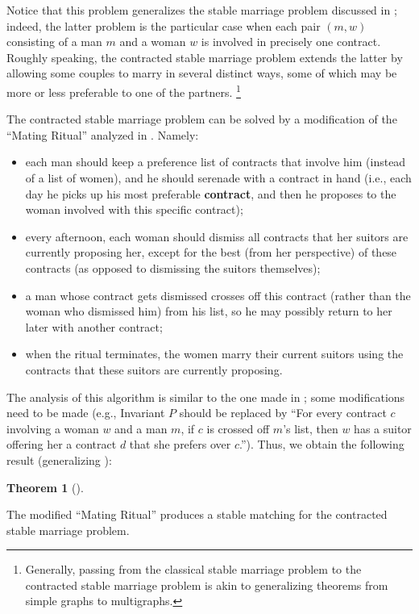 \documentclass[numbers=enddot,12pt,final,onecolumn,notitlepage]{scrartcl}%
\theoremstyle{definition}
\newtheorem{theo}{Theorem}[section]
\newenvironment{theorem}[1][]
{\begin{theo}[#1]\begin{leftbar}}
{\end{leftbar}\end{theo}}
\newcommand{\tup}[1]{\left( #1 \right)}
\begin{document}
Notice that this problem generalizes the stable marriage
problem discussed in \cite[Section 6.4]{LeLeMe16}; indeed, the
latter problem is the particular case when each pair $\tup{m, w}$
consisting of a man $m$ and a woman $w$ is involved in precisely
one contract.
Roughly speaking, the contracted stable marriage problem
extends the latter by allowing some couples to marry in
several distinct ways, some of which may be more or less
preferable to one of the partners.
\footnote{Generally, passing from the classical stable marriage
problem to the contracted stable marriage problem is akin
to generalizing theorems from simple graphs to multigraphs.}

The contracted stable marriage problem can be solved by a
modification of the ``Mating Ritual'' analyzed in
\cite[Section 6.4]{LeLeMe16}.
Namely:
\begin{itemize}
 \item each man should keep a preference list of contracts that
       involve him (instead of a list of women),
       and he should serenade with a contract in hand (i.e.,
       each day he picks up his most preferable
       \textbf{contract}, and then he proposes to the woman
       involved with this specific contract);
 \item every afternoon,
       each woman should dismiss all contracts that her
       suitors are currently proposing her,
       except for the best (from her perspective) of these contracts
       (as opposed to dismissing the suitors themselves);
 \item a man whose contract gets dismissed crosses off this
       contract (rather than the woman who dismissed him) from
       his list,
       so he may possibly return to her later with another
       contract;
 \item when the ritual terminates, the women marry their
       current suitors using the contracts that these suitors
       are currently proposing.
\end{itemize}

The analysis of this algorithm is similar to the one made in
\cite[Section 6.4.2 and Section 6.4.3]{LeLeMe16}; some
modifications need to be made (e.g., Invariant $P$ should
be replaced by
``For every contract $c$ involving a woman $w$ and a man $m$,
if $c$ is crossed off $m$'s list, then $w$ has a suitor
offering her a contract $d$ that she prefers over $c$.'').
Thus, we obtain the following result
(generalizing \cite[Theorem 6.4.4]{LeLeMe16}):

\begin{theorem} \label{thm.stable-matching.contracted.MR.correct}
The modified ``Mating Ritual'' produces a stable matching
for the contracted stable marriage problem.
\end{theorem}
\end{document}
